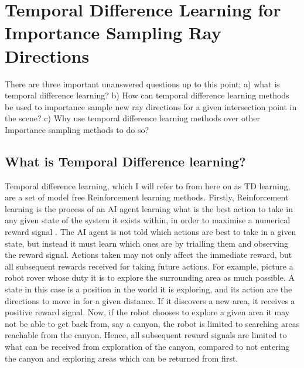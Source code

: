 \documentclass[ %
                    author={Callum Pearce},
                supervisor={Dr. Neill Campbell},
                    degree={MEng},
                     title={How effective are Temporal difference learning methods for reducing the number of zero contribution light paths while still accurately approximating Global Illumination in Path tracing?},
                  subtitle={},
                      type={research},
                      year={2019} ]{dissertation}
\begin{document}
\section{Temporal Difference Learning for Importance Sampling Ray Directions}
\label{sec:td_learn_for_importance}

There are three important unanswered questions up to this point; a) what is temporal
difference learning?  b) How can temporal difference learning methods be 
used to importance sample new ray directions for a given intersection point in 
the scene? c) Why use temporal difference learning methods over other Importance 
sampling methods to do so? 

\subsection{What is Temporal Difference learning?}
Temporal difference learning, which I will refer to from 
here on as TD learning, are a set of model free Reinforcement learning methods. 
Firstly, Reinforcement learning is the process of an AI agent learning what is the 
best action to take in any given state of the system it exists within, in order to 
maximise a numerical reward signal \cite{sutton2011reinforcement}.
The AI agent is not told which actions are  best to take in a given state, but
 instead it must learn which ones are by trialling them and observing the reward 
signal. Actions taken may not only affect the immediate 
reward, but all subsequent rewards received for taking future actions. For 
example, picture a robot rover whose duty it is to explore the surrounding area 
as much possible. A state in this case is a position in the world it is exploring, 
and its action are the directions to move in for a given distance. If it discovers 
a new area, it receives a positive reward signal. Now, if the robot chooses to 
explore a given area it may not be able to get back from, say a canyon, the 
robot is limited to searching areas reachable from the canyon. Hence, all 
subsequent reward signals are limited to what can be received from exploration 
of the canyon, compared to not entering the canyon and exploring areas which 
can be returned from first.
\end{document}
